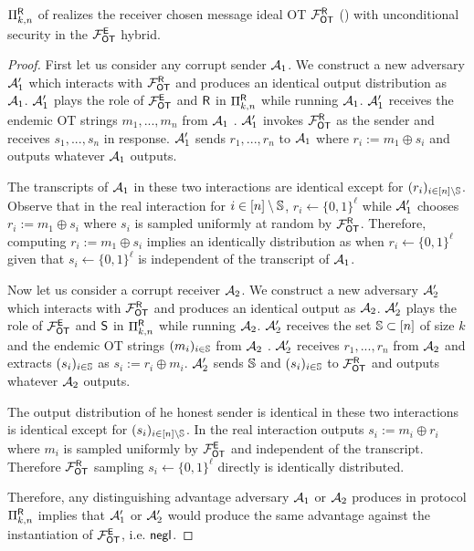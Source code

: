 \begin{lemma}\label{lem:EtoR}
	$\Pi^{\mathsf{R}}_{k,n}$ of  realizes the receiver chosen message ideal OT $\mathcal{F}_{\mathsf{OT}}^{\mathsf{R}}$ () with unconditional security in the $\mathcal{F}_{\mathsf{OT}}^\mathsf{E}$ hybrid.
\end{lemma}
\iffullversion
\begin{proof}
	First let us consider any corrupt sender $\mathcal{A}_1$. We construct a new adversary $\mathcal{A}_1'$ which interacts with $\mathcal{F}_{\mathsf{OT}}^{\mathsf{R}}$ and produces an identical output distribution as $\mathcal{A}_1$.  $\mathcal{A}_1'$ plays the role of $\mathcal{F}_{\mathsf{OT}}^\mathsf{E}$ and $\mathsf{R}$ in $\Pi^{\mathsf{R}}_{k,n}$ while running $\mathcal{A}_1$. $\mathcal{A}_1'$ receives the endemic OT strings $m_1,...,m_n$ from $\mathcal{A}_1$%
. $\mathcal{A}_1'$ invokes $\mathcal{F}_{\mathsf{OT}}^{\mathsf{R}}$ as the sender and receives $s_1,...,s_n$ in response. $\mathcal{A}_1'$ sends $r_1,...,r_n$ to $\mathcal{A}_1$ where $r_i:=m_1\oplus s_i$ and 	 outputs whatever $\mathcal{A}_1$ outputs.
	
	The transcripts of $\mathcal{A}_1$ in these two interactions are identical except for $(r_i)_{i\in [n]\setminus \mathsf{\mathbb S}}$. Observe that in the real interaction for $i\in [n]\setminus\mathsf{\mathbb S}$, $r_i\gets\{0,1\}^\ell$ while $\mathcal{A}_1'$ chooses $r_i:=m_1\oplus s_i$ where $s_i$ is sampled uniformly at random by $\mathcal{F}_{\mathsf{OT}}^{\mathsf{R}}$. Therefore, computing $r_i:=m_1\oplus s_i$ implies an identically distribution as when $r_i\gets\{0,1\}^\ell$ given that $s_i\gets\{0,1\}^\ell$ is independent of the transcript of $\mathcal{A}_1$. 
	
	
	Now let us consider a corrupt receiver $\mathcal{A}_2$. We construct a new adversary $\mathcal{A}_2'$ which interacts with $\mathcal{F}_{\mathsf{OT}}^{\mathsf{R}}$ and produces an identical output as $\mathcal{A}_2$. $\mathcal{A}_2'$ plays the role of $\mathcal{F}_{\mathsf{OT}}^\mathsf{E}$ and $\mathsf{S}$ in $\Pi^{\mathsf{R}}_{k,n}$ while running $\mathcal{A}_2$. $\mathcal{A}_2'$ receives the set $\mathsf{\mathbb S}\subset[n]$ of size $k$ and the endemic OT strings $(m_i)_{i\in \mathsf{\mathbb S}}$ from $\mathcal{A}_2$%
. $\mathcal{A}_2'$ receives $r_1,...,r_n$ from $\mathcal{A}_2$ %
 and extracts $(s_i)_{i\in \mathsf{\mathbb S}}$ as $s_i:=r_i\oplus m_i$. $\mathcal{A}_2'$ sends $\mathsf{\mathbb S}$ and $(s_i)_{i\in \mathsf{\mathbb S}}$ to $\mathcal{F}_{\mathsf{OT}}^{\mathsf{R}}$ and outputs whatever $\mathcal{A}_2$ outputs.
	
	The output distribution of he honest sender is identical in these two interactions is identical except for $(s_i)_{i\in [n]\setminus \mathsf{\mathbb S}}$. In the real interaction \send outputs $s_i:=m_i\oplus r_i$ where $m_i$ is sampled uniformly by $\mathcal{F}_{\mathsf{OT}}^\mathsf{E}$ and independent of the transcript. Therefore $\mathcal{F}_{\mathsf{OT}}^{\mathsf{R}}$ sampling $s_i\gets\{0,1\}^\ell$ directly is identically distributed.
	
	Therefore, any distinguishing advantage adversary $\mathcal{A}_1$ or $\mathcal{A}_2$ produces in protocol $\Pi^{\mathsf{R}}_{k,n}$ implies  that $\mathcal{A}_1'$ or $\mathcal{A}_2'$ would produce the same advantage against the instantiation of $\mathcal{F}_{\mathsf{OT}}^\mathsf{E}$, i.e. $\mathsf{negl}$.
\end{proof}
